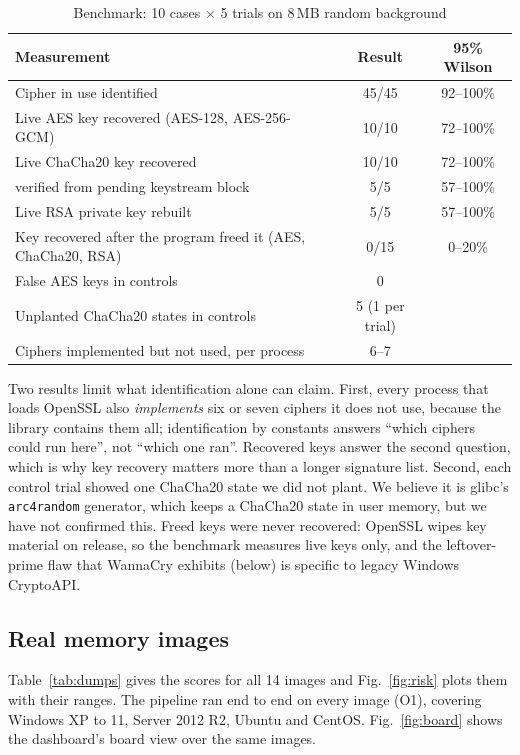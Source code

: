 \begin{table}[t]
\centering
\caption{Benchmark: 10 cases $\times$ 5 trials on 8\,MB random background}
\label{tab:bench}
\footnotesize
\begin{tabularx}{\columnwidth}{@{}Xcc@{}}
\toprule
Measurement & Result & 95\% Wilson\\
\midrule
Cipher in use identified & 45/45 & 92--100\%\\
Live AES key recovered (AES-128, AES-256-GCM) & 10/10 & 72--100\%\\
Live ChaCha20 key recovered & 10/10 & 72--100\%\\
\quad verified from pending keystream block & 5/5 & 57--100\%\\
Live RSA private key rebuilt & 5/5 & 57--100\%\\
Key recovered after the program freed it (AES, ChaCha20, RSA) & 0/15 & 0--20\%\\
False AES keys in controls & 0 & \\
Unplanted ChaCha20 states in controls & 5 (1 per trial) & \\
Ciphers implemented but not used, per process & 6--7 & \\
\bottomrule
\end{tabularx}
\end{table}

Two results limit what identification alone can claim. First, every process that loads OpenSSL also
\emph{implements} six or seven ciphers it does not use, because the library contains them all; identification
by constants answers ``which ciphers could run here'', not ``which one ran''. Recovered keys answer the second
question, which is why key recovery matters more than a longer signature list. Second, each control trial
showed one ChaCha20 state we did not plant. We believe it is glibc's \texttt{arc4random} generator, which keeps a
ChaCha20 state in user memory, but we have not confirmed this. Freed keys were never recovered: OpenSSL wipes
key material on release, so the benchmark measures live keys only, and the leftover-prime flaw that WannaCry
exhibits (below) is specific to legacy Windows CryptoAPI.

\subsection{Real memory images}
Table~\ref{tab:dumps} gives the scores for all 14 images and Fig.~\ref{fig:risk} plots them with their ranges.
The pipeline ran end to end on every image (O1), covering Windows XP to 11, Server 2012 R2, Ubuntu and CentOS.
Fig.~\ref{fig:board} shows the dashboard's board view over the same images.


